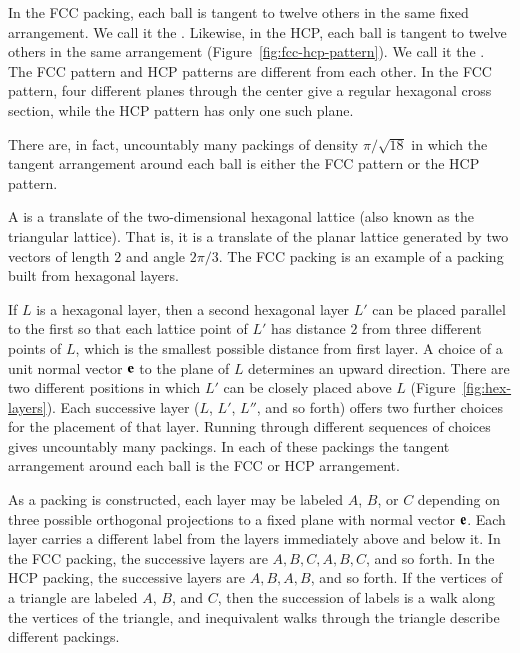 In the FCC packing, each ball is tangent to twelve others in the same
fixed arrangement.  We call it the .  Likewise,
in the HCP, each ball is tangent to twelve others in the same
arrangement (Figure~\ref{fig:fcc-hcp-pattern}).  We call it the
.  The FCC pattern and HCP patterns are different
from each other.  In the FCC pattern, four different planes through
the center give a regular hexagonal cross section, while the HCP
pattern has only one such plane.

\figSGIWBEN %

There are, in fact, uncountably many packings of density
$\pi/\sqrt{18}$ in which the tangent arrangement around each ball is
either the FCC pattern or the HCP pattern.

A  is a translate of the
two-dimensional hexagonal lattice (also known as the triangular
lattice). That is, it is a translate of the planar lattice generated
by two vectors of length $2$ and angle $2\pi/3$.  The FCC
 packing is an example of a packing built from hexagonal layers.

 If $L$ is a hexagonal layer, then a second hexagonal layer $L'$ can be
 placed parallel to the first so that each lattice point of $L'$ has
 distance $2$ from three different points of $L$,
 which is the smallest possible distance from first layer.  A choice
 of a unit normal vector ${\mathbf e}$ to the plane of $L$ determines an upward
 direction.  There are two different positions in which $L'$ can be
 closely placed above $L$
(Figure~\ref{fig:hex-layers}).  Each successive layer 
  ($L$, $L'$, $L''$, and so
 forth) offers two further choices  for the placement of
 that layer. Running through different 
 sequences of choices gives uncountably many packings.  In each of
 these packings the tangent arrangement around each ball is the FCC or HCP arrangement.

\figCCQCYWU %

As a packing is constructed, each layer may be labeled
$A$, $B$, or $C$ depending on three possible orthogonal projections to a fixed plane
with normal vector ${\mathbf e}$.
Each layer carries a different label from the layers immediately
above and below it.  In the FCC packing, the successive layers are
$A,B,C,A,B,C$, and so forth.  In the HCP packing, the successive layers are
$A,B,A,B$, and so forth.  If the vertices of a triangle are labeled $A$, $B$, and $C$,
then the succession of labels is a
walk along the vertices of the triangle, and inequivalent walks through the
triangle describe different packings.


